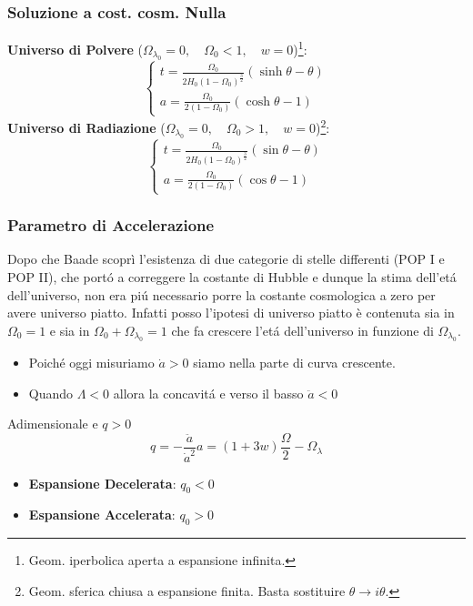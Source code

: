 \documentclass[12pt, a4paper]{article}
\begin{document}
\subsubsection{Soluzione a cost. cosm. Nulla}
\textbf{Universo di Polvere} ($\Omega_{\lambda_0}=0,\quad \Omega_0<1,\quad w=0$)\footnote{Geom. iperbolica aperta a espansione infinita.}:
 \begin{equation}
     \begin{cases}
         t=\frac{\Omega_0}{2H_0(1-\Omega_0)^{\frac{3}{2}}}(\sinh{\theta}-\theta)
         \\
         a=\frac{\Omega_0}{2(1-\Omega_0)}(\cosh{\theta}-1)
     \end{cases}
 \end{equation}
\textbf{Universo di Radiazione} ($\Omega_{\lambda_0}=0,\quad \Omega_0>1,\quad w=0$)\footnote{Geom. sferica chiusa a espansione finita. Basta sostituire $\theta \rightarrow i\theta$.}:
 \begin{equation}
     \begin{cases}
         t=\frac{\Omega_0}{2H_0(1-\Omega_0)^{\frac{3}{2}}}(\sin{\theta}-\theta)
         \\
         a=\frac{\Omega_0}{2(1-\Omega_0)}(\cos{\theta}-1)
     \end{cases}
 \end{equation}
\subsubsection{Parametro di Accelerazione}
Dopo che Baade scoprì l'esistenza di due categorie di stelle differenti (POP I e POP II), che port\'{o} a correggere la costante di Hubble e dunque la stima dell'et\'{a} dell'universo, non era pi\'{u} necessario porre la costante cosmologica a zero per avere universo piatto. Infatti posso l'ipotesi di universo piatto è contenuta sia in $\Omega_0=1$ e sia in $\Omega_0 + \Omega_{\lambda_0}=1$ che fa crescere l'et\'{a} dell'universo in funzione di $\Omega_{\lambda_0}$.
\begin{itemize}
    \item Poich\'{e} oggi misuriamo $\dot{a}>0$ siamo nella parte di curva crescente.
    \item Quando $\Lambda<0$ allora la concavit\'{a} e verso il basso $\ddot{a}<0$
\end{itemize}
Adimensionale e $q>0$
\begin{equation}
    q=-\frac{\ddot{a}}{\dot{a}^2}a=(1+3w)\frac{\Omega}{2}-\Omega_{\lambda}
\end{equation}
\begin{itemize}
    \item \textbf{Espansione Decelerata}: $q_0<0$
    \item \textbf{Espansione Accelerata}: $q_0>0$
\end{itemize}{}
\end{document}
